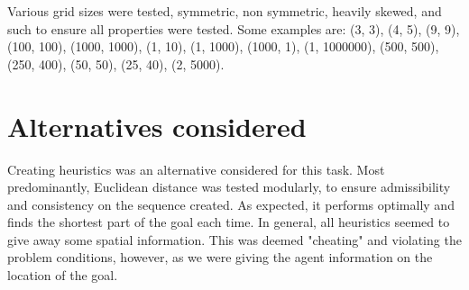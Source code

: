 \documentclass{article}
\begin{document}
Various grid sizes were tested, symmetric, non symmetric, heavily skewed, and
such to ensure all properties were tested. Some examples are: (3, 3), (4, 5),
(9, 9), (100, 100), (1000, 1000), (1, 10), (1, 1000), (1000, 1), (1, 1000000),
(500, 500), (250, 400), (50, 50), (25, 40), (2, 5000).

\section{Alternatives considered}

Creating heuristics was an alternative considered for this task. Most
predominantly, Euclidean distance was tested modularly, to ensure admissibility
and consistency on the sequence created. As expected, it performs optimally and
finds the shortest part of the goal each time. In general, all heuristics seemed to give 
away some spatial information. This was deemed "cheating" and
violating the problem conditions, however, as we were giving the agent
information on the location of the goal.



\end{document}
